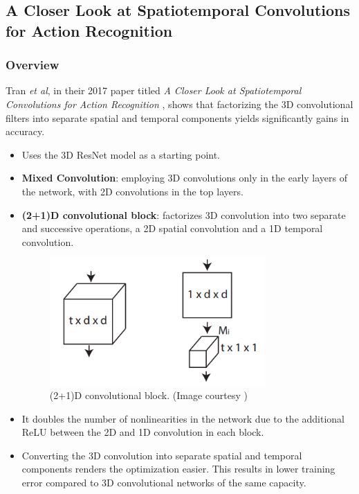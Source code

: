 \subsection{A Closer Look at Spatiotemporal Convolutions for Action Recognition}

\subsubsection{Overview}

\par Tran \textit{et al}, in their 2017 paper titled \textit{A Closer Look at Spatiotemporal Convolutions for Action Recognition} \cite{r(2+1)d}, shows that factorizing the 3D convolutional filters into separate spatial and temporal components yields significantly gains in accuracy.\par

\begin{itemize}
    \item Uses the 3D ResNet model as a starting point.
    \item \textbf{Mixed Convolution}:  employing 3D convolutions only in the early layers of the network, with 2D convolutions in the top layers.   
    \item \textbf{(2+1)D convolutional block}: factorizes 3D convolution into two separate and successive operations, a 2D spatial convolution and a 1D temporal convolution.
    \begin{figure}[H]
        \includegraphics[width=\linewidth]{assets/img/r2+1d.png}
        \caption{(2+1)D convolutional block. (Image courtesy \cite{r(2+1)d})}
    \end{figure}
    \item It doubles the number of nonlinearities in the network due to the additional ReLU between the 2D and 1D convolution in each block.
    \item Converting the 3D convolution into separate spatial and temporal components renders the optimization easier. This results in lower training error compared to 3D convolutional networks of the same capacity.
\end{itemize}

